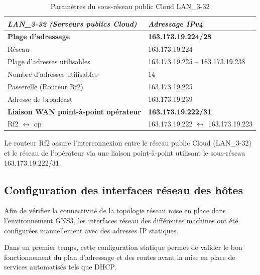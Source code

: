 \documentclass[12pt,a4paper, oneside]{memoir}
\begin{document}
\begin{enumerate}
\begin{table}[H]
	\centering
	\renewcommand{\arraystretch}{1.3}
	\begin{tabular}{|l|l|}
		\hline
		\rowcolor{gray!20}
		 \textbf{\textit{LAN\_3-32 (Serveurs publics Cloud)}} & \textbf{\textit{Adressage IPv4}} \\
		\hline
		\textbf{Plage d'adressage} & \textbf{163.173.19.224/28} \\
		\hline
		Réseau & 163.173.19.224 \\
		\hline
		Plage d'adresses utilisables & 163.173.19.225 -- 163.173.19.238 \\
		\hline
		Nombre d'adresses utilisables & 14 \\
		\hline
		Passerelle (Routeur Rf2) & 163.173.19.225 \\
		\hline
		Adresse de broadcast & 163.173.19.239 \\
		\hline
		\hline
		\textbf{Liaison WAN point-à-point opérateur} & \textbf{163.173.19.222/31}\\
		\hline
		Rf2 $\leftrightarrow$ op &	163.173.19.222 $\leftrightarrow$ 163.173.19.223\\
		\hline
	\end{tabular}
	\caption{Paramètres du sous-réseau public Cloud LAN\_3-32}
\end{table}


	Le routeur Rf2 assure l’interconnexion entre le réseau public Cloud (LAN\_3-32) et le réseau de l’opérateur via une liaison point-à-point utilisant le sous-réseau 163.173.19.222/31.
\end{enumerate}

\subsection{Configuration des interfaces réseau des hôtes}

Afin de vérifier la connectivité de la topologie réseau mise en place dans l’environnement GNS3, les interfaces réseau des différentes machines ont été configurées manuellement avec des adresses IP statiques.

Dans un premier temps, cette configuration statique permet de valider le bon fonctionnement du plan d’adressage et des routes avant la mise en place de services automatisés tels que DHCP.
\end{document}
